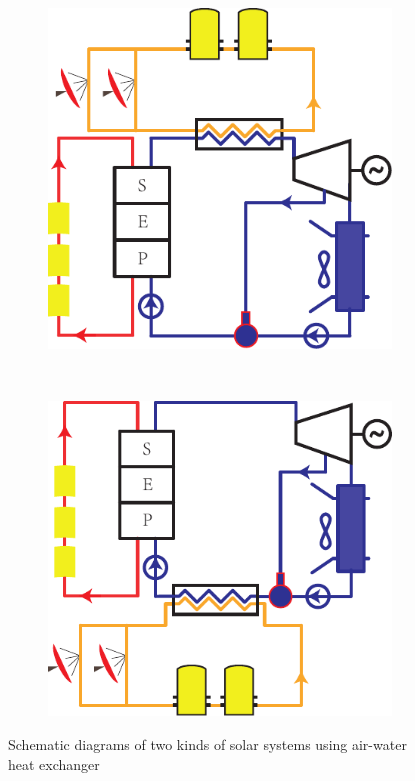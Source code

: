 \noindent \begin{figure}[htbp]
\centering
	\begin{subfigure}[b]{0.4\columnwidth}
	\includegraphics[width = \columnwidth]{fig/air-water1}
	\caption{}\label{fig:air-water1}
	\end{subfigure}
	~
\begin{subfigure}[b]{0.4\columnwidth}
	\includegraphics[width = \columnwidth]{fig/air-water2}
	\caption{}\label{fig:air-water2}
	\end{subfigure}
	\caption{Schematic diagrams of two kinds of solar systems using air-water heat exchanger}
	\label{fig:air-water}
\end{figure}

